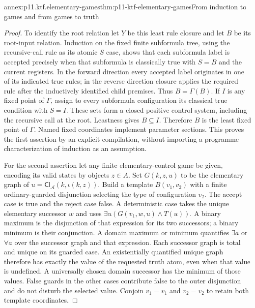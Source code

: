 \begin{annexitem}{annex:p11.ktf.elementary-games}{thm:p11-ktf-elementary-games}{From induction to games and from games to truth}
\begin{proof}
To identify the root relation let \(Y\) be this least rule
closure and let \(B\) be its root-input relation. Induction
on the fixed finite subformula tree, using the recursive-call rule
as its atomic \(S\) case, shows that each subformula label
is accepted precisely when that subformula is classically true with
\(S=B\) and the current registers. In the forward direction
every accepted label originates in one of its indicated true rules;
in the reverse direction closure applies the required rule after
the inductively identified child premises. Thus \(B=\Gamma(B)\).
If \(I\) is any fixed point of \(\Gamma\), assign to every
subformula configuration its classical true condition with \(S=I\).
These sets form a closed positive control system, including the
recursive call at the root. Leastness gives \(B\subseteq I\).
Therefore \(B\) is the least fixed point of \(\Gamma\).
Named fixed coordinates implement parameter sections. This proves
the first assertion by an explicit compilation, without importing
a programme characterization of induction as an assumption.

For the second assertion let any finite elementary-control game
be given, encoding its valid states by objects \(z\in A\).
Set
\(G(k,z,u)\) to be the elementary graph of
\(u=\mathsf{Cl}_{\mathcal A}(k,\iota(k,z))\).
Build a template \(B(v_1,v_2)\) with a finite ordinary-guarded
disjunction selecting the type of configuration \(v_2\).
The accept case is true and the reject case false. A deterministic
case takes the unique elementary successor \(w\) and uses
\(\exists u(G(v_1,w,u)\land T(u))\). A binary maximum
is the disjunction of that expression for its two successors;
a binary minimum is their conjunction. A domain maximum or
minimum quantifies \(\exists a\) or \(\forall a\)
over the successor graph and that expression. Each successor graph
is total and unique on its guarded case. An existentially quantified
unique graph therefore has exactly the value of the requested
truth atom, even when that value is undefined. A universally
chosen domain successor has the minimum of those values. False
guards in the other cases contribute false to the outer disjunction
and do not disturb the selected value. Conjoin \(v_1=v_1\)
and \(v_2=v_2\) to retain both template coordinates.


\end{proof}
\end{annexitem}
